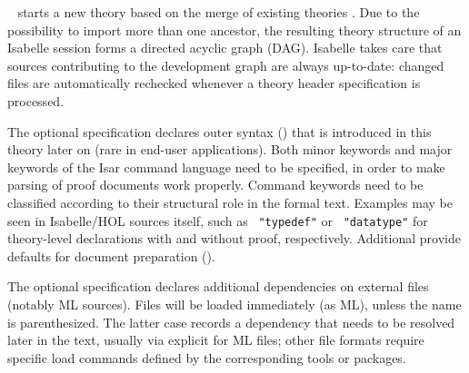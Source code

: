 \begin{isabellebody}
\begin{isamarkuptext}
\begin{description}
  \item \hyperlink{command.theory}{\mbox{}}~
  starts a new theory  based on the merge of existing
  theories .  Due to the possibility to import more
  than one ancestor, the resulting theory structure of an Isabelle
  session forms a directed acyclic graph (DAG).  Isabelle takes care
  that sources contributing to the development graph are always
  up-to-date: changed files are automatically rechecked whenever a
  theory header specification is processed.

  The optional \hypertarget{keyword.keywords}{\hyperlink{keyword.keywords}{\mbox{}}} specification declares outer
  syntax () that is introduced in this theory
  later on (rare in end-user applications).  Both minor keywords and
  major keywords of the Isar command language need to be specified, in
  order to make parsing of proof documents work properly.  Command
  keywords need to be classified according to their structural role in
  the formal text.  Examples may be seen in Isabelle/HOL sources
  itself, such as \hyperlink{keyword.keywords}{\mbox{}}~\verb|"typedef"|
   or \hyperlink{keyword.keywords}{\mbox{}}~\verb|"datatype"|  for theory-level declarations
  with and without proof, respectively.  Additional \hyperlink{syntax.tags}{\mbox{}}
  provide defaults for document preparation ().
  
  The optional \hypertarget{keyword.uses}{\hyperlink{keyword.uses}{\mbox{}}} specification declares additional
  dependencies on external files (notably ML sources).  Files will be
  loaded immediately (as ML), unless the name is parenthesized.  The
  latter case records a dependency that needs to be resolved later in
  the text, usually via explicit \hyperlink{command.use}{\mbox{}} for ML files;
  other file formats require specific load commands defined by the
  corresponding tools or packages.
  

\end{description}
\end{isamarkuptext}
\end{isabellebody}
